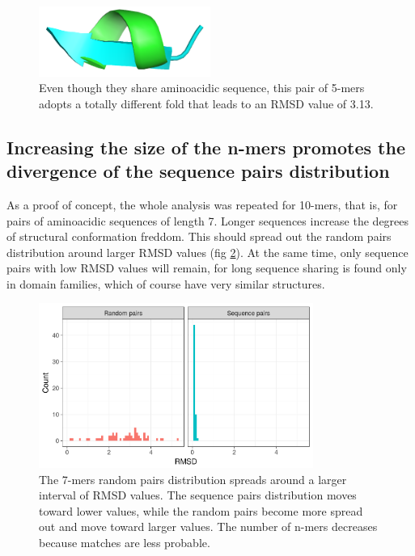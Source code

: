 \documentclass[a4paper, 11pt]{article} %
\begin{document}
\begin{figure}[!h]
\begin{center}
\includegraphics[width = 0.5\textwidth]{../plots/high_rmsd.png}
\end{center}

\label{fig:high_rmsd}
\caption{Even though they share aminoacidic sequence, this pair of 5-mers adopts a totally different fold that leads to an RMSD value of 3.13.}
\end{figure}

\subsection{Increasing the size of the n-mers promotes the divergence of the sequence pairs distribution}

As a proof of concept, the whole analysis was repeated for 10-mers, that is, for pairs of aminoacidic sequences of length 7. Longer sequences increase the degrees of structural conformation freddom. This should spread out the random pairs distribution around larger RMSD values (fig \ref{fig:7mers}). At the same time, only sequence pairs with low RMSD values will remain, for long sequence sharing is found only in domain families, which of course have very similar structures.

\begin{figure}
\begin{center}
\includegraphics[width = 0.8\textwidth]{../plots/7mers.png}
\caption{The 7-mers random pairs distribution spreads around a larger interval of RMSD values. The sequence pairs distribution moves toward lower values, while the random pairs become more spread out and move toward larger values. The number of n-mers decreases because matches are less probable.}
\label{fig:7mers}
\end{center}
\end{figure}
\end{document}
